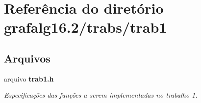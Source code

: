 \section{Referência do diretório grafalg16.2/trabs/trab1}
\label{dir_eb4a0ede1a0e0117457f5dca44f58d07}
\subsection*{Arquivos}
\begin{DoxyCompactItemize}
\item 
arquivo {\bf trab1.\+h}
\begin{DoxyCompactList}\small\item\em Especificações das funções a serem implementadas no trabalho 1. \end{DoxyCompactList}\end{DoxyCompactItemize}
